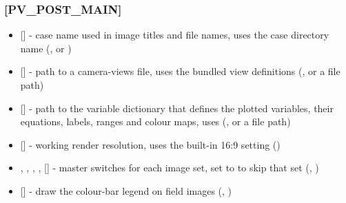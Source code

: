 \subsubsection{[PV\_POST\_MAIN]}
\begin{itemize}
    \item {} [] - case name used in image titles and file names,  uses the case directory name (, or )

    \item {} [] - path to a camera-views file,  uses the bundled view definitions (, or a file path)

    \item {} [] - path to the variable dictionary that defines the plotted variables, their equations, labels, ranges and colour maps,  uses  (, or a file path)

    \item {} [] - working render resolution,  uses the built-in 16:9 setting ()

    \item {}, , , ,  [] - master switches for each image set, set to  to skip that set (, )

    \item {} [] - draw the colour-bar legend on field images (, )
\end{itemize}

